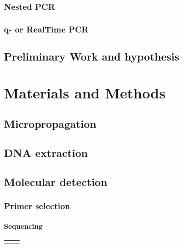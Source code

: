\documentclass[a4paper]{article}
\begin{document}
\subsubsection{Nested PCR}
\subsubsection{q- or RealTime PCR}

\subsection{Preliminary Work and hypothesis}

\pagebreak

\section{Materials and Methods}
\subsection{Micropropagation}

\subsection{DNA extraction}

\subsection{Molecular detection}

\subsubsection{Primer selection}

\paragraph{Sequencing}
\pagebreak
{}
\begin{landscape}

\begin{table}[!h]
\centering 
{
\begin{tabular}{p{10cm} p{11cm}}
\begin{internallinenumbers}
\end{internallinenumbers}
&
\\
\end{tabular}}
\end{table}

\end{landscape}
\restoregeometry
\end{document}
